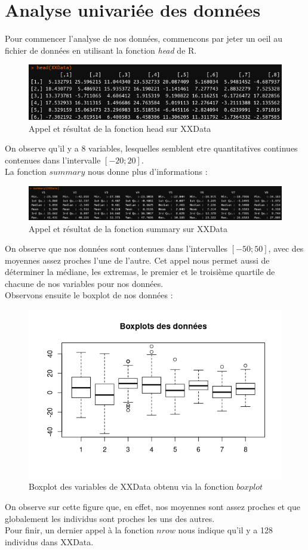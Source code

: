 \documentclass[11pt]{article}
\begin{document}
\section{Analyse univariée des données}
Pour commencer l'analyse de nos données, commencons par jeter un oeil au fichier de données en utilisant la fonction \emph{head} de R.
\begin{figure}[H]
\centering
\includegraphics[scale=.75]{head.png}
\caption{Appel et résultat de la fonction head sur XXData}
\end{figure}
\noindent On observe qu'il y a 8 variables, lesquelles semblent etre quantitatives continues contenues dans l'intervalle $[-20;20]$.\\
La fonction $summary$ nous donne plus d'informations :
\begin{figure}[H]
\centering
\includegraphics[scale=.5]{summary.png}
\caption{Appel et résultat de la fonction summary sur XXData}
\end{figure}
\noindent On observe que nos données sont contenues dans l'intervalles $[-50;50]$, avec des moyennes assez proches l'une de l'autre. Cet appel nous permet aussi de déterminer la médiane, les extremas, le premier et le troisième quartile de chacune de nos variables pour nos données.\\
\newpage
\noindent Observons ensuite le boxplot de nos données :
\begin{figure}[H]
\centering
\includegraphics[scale=1]{boxplot.png}
\caption{Boxplot des variables de XXData obtenu via la fonction $boxplot$}
\end{figure}
\noindent On observe sur cette figure que, en effet, nos moyennes sont assez proches et que globalement les individus sont proches les uns des autres.\\
Pour finir, un dernier appel à la fonction $nrow$ nous indique qu'il y a 128 individus dans XXData.
\newpage
\end{document}
